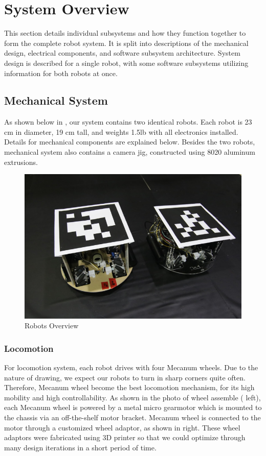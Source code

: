 \section{System Overview}
\label{sec:system_overview}

This section details individual subsystems and how they function together to form the complete robot system. It is split into descriptions of the mechanical design, electrical components, and software subsystem architecture. System design is described for a single robot, with some software subsystems utilizing information for both robots at once.

\subsection{Mechanical System}
\label{sec:mechanical}
As shown below in , our system contains two identical robots. Each robot is 23 cm in diameter, 19 cm tall, and weights 1.5lb with all electronics installed. Details for mechanical components are explained below. Besides the two robots, mechanical system also contains a camera jig, constructed using 8020 aluminum extrusions. 

\begin{figure}[h!]
\centering
\includegraphics[width=0.98\columnwidth]{figs/full_system.png}
\caption{Robots Overview}
\label{fig:so1}
\end{figure}

\subsubsection{Locomotion}
\label{sec:me_locomotion}
For locomotion system, each robot drives with four Mecanum wheels. Due to the nature of drawing, we expect our robots to turn in sharp corners quite often. Therefore, Mecanum wheel become the best locomotion mechanism, for its high mobility and high controllability. As shown in the photo of wheel assemble ( left), each Mecanum wheel is powered by a metal micro gearmotor which is mounted to the chassis via an off-the-shelf motor bracket. Mecanum wheel is connected to the motor through a customized wheel adaptor, as shown in  right. These wheel adaptors were fabricated using 3D printer so that we could optimize through many design iterations in a short period of time.

